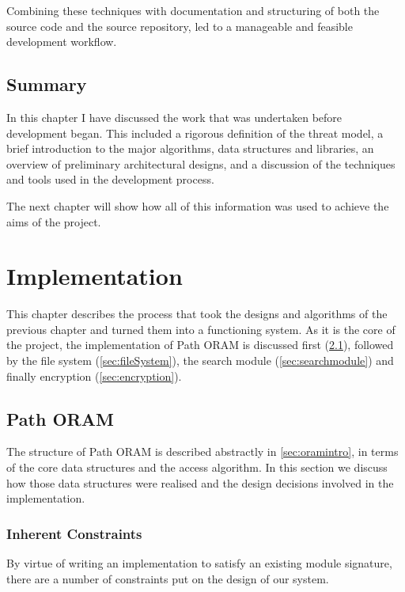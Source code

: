 \documentclass[12pt,a4paper,twoside,openright]{report}
\begin{document}
Combining these techniques with documentation and structuring of both the source code and the source repository, led to a manageable and feasible development workflow.

\section{Summary}

In this chapter I have discussed the work that was undertaken before development began. This included a rigorous definition of the threat model, a brief introduction to the major algorithms, data structures and libraries, an overview of preliminary architectural designs, and a discussion of the techniques and tools used in the development process.

The next chapter will show how all of this information was used to achieve the aims of the project.

\chapter{Implementation}

This chapter describes the process that took the designs and algorithms of the previous chapter and turned them into a functioning system. As it is the core of the project, the implementation of Path ORAM is discussed first (\cref{sec:pathORAM}), followed by the file system (\cref{sec:fileSystem}), the search module (\cref{sec:searchmodule}) and finally encryption (\cref{sec:encryption}).


\section{Path ORAM}
\label{sec:pathORAM}

The structure of Path ORAM is described abstractly in \cref{sec:oramintro}, in terms of the core data structures and the access algorithm. In this section we discuss how those data structures were realised and the design decisions involved in the implementation.

\subsection{Inherent Constraints}
\label{subsec:constraints}

By virtue of writing an implementation to satisfy an existing module signature, there are a number of constraints put on the design of our system.
\end{document}
